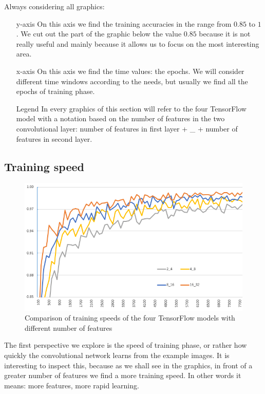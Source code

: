 Always considering all graphics:
\begin{itemize}
	\item[y-axis] On this axis we find the training accuracies in the range from $0.85$ to $1$. We cut out the part of the graphic below the value $0.85$ because it is not really useful and mainly because it allows us to focus on the most interesting area.
	\item[x-axis] On this axis we find the time values: the epochs. We will consider different time windows according to the needs, but usually we find all the epochs of training phase.
	\item[Legend] In every graphics of this section will refer to the four TensorFlow model with a notation based on the number of features in the two convolutional layer: number of features in first layer + \_ + number of features in second layer.
\end{itemize}

\subsection{Training speed}

\begin{figure}[t]
	\caption{Comparison of training speeds of the four TensorFlow models with different number of features}
	\label{fig:training_speed}
	\centering
	\includegraphics[width=1\textwidth]{Images/training_speed}
\end{figure}

The first perspective we explore is the speed of training phase, or rather how quickly the convolutional network learns from the example images. It is interesting to inspect this, because as we shall see in the graphics, in front of a greater number of features we find a more training speed. In other words it means: more features, more rapid learning.

